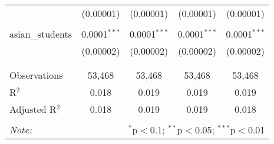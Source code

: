 \begin{table}[!htbp]
\begin{tabular}{@{\extracolsep{-2pt}}lcccc}
  & (0.00001) & (0.00001) & (0.00001) & (0.00001) \\ 
  & & & & \\ 
 asian\_students & 0.0001$^{***}$ & 0.0001$^{***}$ & 0.0001$^{***}$ & 0.0001$^{***}$ \\ 
  & (0.00002) & (0.00002) & (0.00002) & (0.00002) \\ 
  & & & & \\ 
\hline \\[-1.8ex] 
Observations & 53,468 & 53,468 & 53,468 & 53,468 \\ 
R$^{2}$ & 0.018 & 0.019 & 0.019 & 0.019 \\ 
Adjusted R$^{2}$ & 0.018 & 0.019 & 0.019 & 0.018 \\ 
\hline 
\hline \\[-1.8ex] 
\textit{Note:}  & \multicolumn{4}{r}{$^{*}$p$<$0.1; $^{**}$p$<$0.05; $^{***}$p$<$0.01} \\ 
\end{tabular} 
\end{table} 
